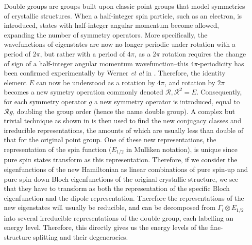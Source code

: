 \documentclass[12pt]{article}
\begin{document}
Double groups are groups built upon classic point groups that model symmetries of crystallic structures. When a half-integer spin particle, such as an electron, is introduced, states with half-integer angular momentum become allowed, expanding the number of symmetry operators. More specifically, the wavefunctions of eigenstates are now no longer periodic under rotation with a period of $2\pi$, but rather with a period of $4\pi$, as a $2\pi$ rotation requires the change of sign of a half-integer angular momentum wavefunction--this $4\pi$-periodicity has been confirmed experimentally by Werner \textit{et al} in \cite{fermion_periodicity}. Therefore, the identity element $E$ can now be understood as a rotation by $4\pi$, and rotation by $2\pi$ becomes a new symetry operation commonly denoted $\mathcal{R}, \mathcal{R}^2=E$. Consequently, for each symmetry operator $g$ a new symmetry operator is introduced, equal to $\mathcal{R}g$, doubling the group order (hence the name double group). A complex but trivial technique as shown in \cite{heine} is then used to find the new conjugacy classes and irreducible representations, the amounts of which are usually less than double of that for the original point group. One of these new representations, the representation of the spin function ($E_{1/2}$ in Mulliken notation), is unique since pure spin states transform as this representation. Therefore, if we consider the eigenfunctions of the new Hamiltonian as linear combinations of pure spin-up and pure spin-down Bloch eigenfunctions of the original crystallic structure, we see that they have to transform as both the representation of the specific Bloch eigenfunction and the dipole representation. Therefore the representations of the new eigenstates will usually be reducible, and can be decomposed from $\Gamma_i\otimes E_{1/2}$ into several irreducible representations of the double group, each labelling an energy level. Therefore, this directly gives us the energy levels of the fine-structure splitting and their degeneracies.
\end{document}

